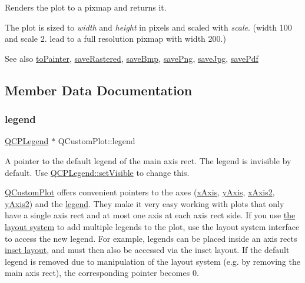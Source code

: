 Renders the plot to a pixmap and returns it.

The plot is sized to {\itshape width} and {\itshape height} in pixels and scaled with {\itshape scale}. (width 100 and scale 2. lead to a full resolution pixmap with width 200.)

\begin{DoxySeeAlso}{See also}
\hyperlink{class_q_custom_plot_a1be68d5c0f1e086d6374d1340a193fb9}{to\+Painter}, \hyperlink{class_q_custom_plot_ad7723ce2edfa270632ef42b03a444352}{save\+Rastered}, \hyperlink{class_q_custom_plot_ae3a86ed0795670e50afa21759d4fa13d}{save\+Bmp}, \hyperlink{class_q_custom_plot_ac92cc9256d12f354b40a4be4600b5fb9}{save\+Png}, \hyperlink{class_q_custom_plot_a76f0d278e630a711fa6f48048cfd83e4}{save\+Jpg}, \hyperlink{class_q_custom_plot_ad5acd34f6b39c3516887d7e54fec2412}{save\+Pdf} 
\end{DoxySeeAlso}


\subsection{Member Data Documentation}
\mbox{\label{class_q_custom_plot_a4eadcd237dc6a09938b68b16877fa6af}} 
\subsubsection{\texorpdfstring{legend}{legend}}
{\footnotesize\ttfamily \hyperlink{class_q_c_p_legend}{Q\+C\+P\+Legend} $\ast$ Q\+Custom\+Plot\+::legend}

A pointer to the default legend of the main axis rect. The legend is invisible by default. Use \hyperlink{class_q_c_p_layerable_a3bed99ddc396b48ce3ebfdc0418744f8}{Q\+C\+P\+Legend\+::set\+Visible} to change this.

\hyperlink{class_q_custom_plot}{Q\+Custom\+Plot} offers convenient pointers to the axes (\hyperlink{class_q_custom_plot_a9a79cd0158a4c7f30cbc702f0fd800e4}{x\+Axis}, \hyperlink{class_q_custom_plot_af6fea5679725b152c14facd920b19367}{y\+Axis}, \hyperlink{class_q_custom_plot_ada41599f22cad901c030f3dcbdd82fd9}{x\+Axis2}, \hyperlink{class_q_custom_plot_af13fdc5bce7d0fabd640f13ba805c0b7}{y\+Axis2}) and the \hyperlink{class_q_custom_plot_a4eadcd237dc6a09938b68b16877fa6af}{legend}. They make it very easy working with plots that only have a single axis rect and at most one axis at each axis rect side. If you use \hyperlink{}{the layout system} to add multiple legends to the plot, use the layout system interface to access the new legend. For example, legends can be placed inside an axis rect\textquotesingle{}s \hyperlink{class_q_c_p_axis_rect_a949f803466619924c7018df4b511ae10}{inset layout}, and must then also be accessed via the inset layout. If the default legend is removed due to manipulation of the layout system (e.\+g. by removing the main axis rect), the corresponding pointer becomes 0.

